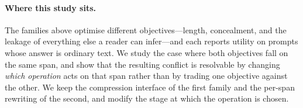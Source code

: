 \paragraph{Where this study sits.}
The families above optimise different objectives---length, concealment, and the leakage of
everything else a reader can infer---and each reports utility on prompts whose answer is
ordinary text. We study the case where both objectives fall on the same span, and show that
the resulting conflict is resolvable by changing \emph{which operation} acts on that span
rather than by trading one objective against the other. We keep the compression interface of
the first family and the per-span rewriting of the second, and modify the stage at which the
operation is chosen.
